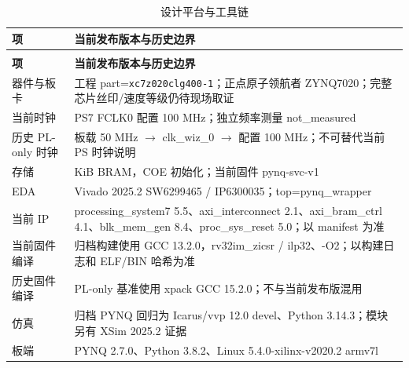 {\small
\renewcommand{\thetable}{2-19}
\begin{longtable}{@{}>{\raggedright\arraybackslash}p{}>{\raggedright\arraybackslash}p{}@{}}
\caption{设计平台与工具链}\label{tab:2-19}\\
\toprule
\textbf{项} & \textbf{当前发布版本与历史边界} \\
\midrule
\endfirsthead
\multicolumn{2}{@{}l}{\footnotesize 续表 2-19}\\
\toprule
\textbf{项} & \textbf{当前发布版本与历史边界} \\
\midrule
\endhead
器件与板卡 & 工程 part=\texttt{xc7z020clg400-\allowbreak{}1}；正点原子领航者 ZYNQ7020；完整芯片丝印/速度等级仍待现场取证 \\
当前时钟 & PS7 FCLK0 配置 100 MHz；独立频率测量 not\_\allowbreak{}measured \\
历史 PL-only 时钟 & 板载 50 MHz $\rightarrow$ clk\_\allowbreak{}wiz\_\allowbreak{}0 $\rightarrow$ 配置 100 MHz；不可替代当前 PS 时钟说明 \\
存储 & 128 KiB BRAM，COE 初始化；当前固件 pynq-svc-v1 \\
EDA & Vivado 2025.2 SW6299465 / IP6300035；top=pynq\_\allowbreak{}wrapper \\
当前 IP & processing\_\allowbreak{}system7 5.5、axi\_\allowbreak{}interconnect 2.1、axi\_\allowbreak{}bram\_\allowbreak{}ctrl 4.1、blk\_\allowbreak{}mem\_\allowbreak{}gen 8.4、proc\_\allowbreak{}sys\_\allowbreak{}reset 5.0；以 manifest 为准 \\
当前固件编译 & 归档构建使用 GCC 13.2.0，rv32im\_\allowbreak{}zicsr / ilp32、-O2；以构建日志和 ELF/BIN 哈希为准 \\
历史固件编译 & PL-only 基准使用 xpack GCC 15.2.0；不与当前发布版混用 \\
仿真 & 归档 PYNQ 回归为 Icarus/vvp 12.0 devel、Python 3.14.3；模块另有 XSim 2025.2 证据 \\
板端 & PYNQ 2.7.0、Python 3.8.2、Linux 5.\allowbreak{}4.\allowbreak{}0-\allowbreak{}xilinx-\allowbreak{}v2020.\allowbreak{}2 armv7l \\
\bottomrule
\end{longtable}
}


